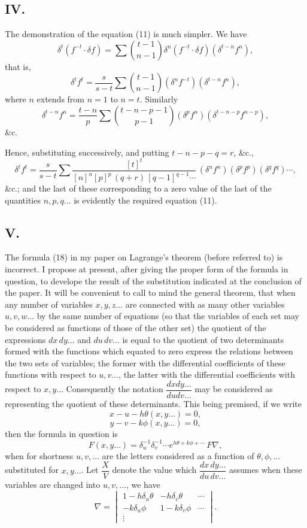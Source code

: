 \documentclass[11pt]{article}
\begin{document}
\subsection*{IV.}

The demonstration of the equation (11) is much simpler. We have
\[ \delta^t(f^{-t}\!\cdot\!\delta f) = \sum\binom{t-1}{n-1}\delta^n(f^{-t}\!\cdot\!\delta f)(\delta^{t-n}f^n), \]
that is,
\[ \delta^t f^t = \frac{s}{s-t}\sum\binom{t-1}{n-1}(\delta^n f^{-t})(\delta^{t-n}f^n), \]
where $n$ extends from $n=1$ to $n=t$. Similarly
\[ \delta^{t-n}f^n = \frac{t-n}{p}\sum\binom{t-n-p-1}{p-1}(\delta^p f^n)(\delta^{t-n-p}f^{n-p}), \]
\&c.

Hence, substituting successively, and putting $t-n-p-q = r$, \&c.,
\[ \delta^t f^t = \frac{s}{s-t}\sum\frac{[t]^t}{[n]^n[p]^p\,(q+r)\,[q-1]^{q-1}\cdots}\,(\delta^n f^n)(\delta^p f^p)(\delta^q f^q)\cdots, \]
\&c.; and the last of these corresponding to a zero value of the last of the quantities $n,p,q\ldots$ is evidently the required equation (11).

\subsection*{V.}

The formula (18) in my paper on Lagrange's theorem (before referred to) is incorrect. I propose at present, after giving the proper form of the formula in question, to develope the result of the substitution indicated at the conclusion of the paper. It will be convenient to call to mind the general theorem, that when any number of variables $x,y,z\ldots$ are connected with as many other variables $u,v,w\ldots$ by the same number of equations (so that the variables of each set may be considered as functions of those of the other set) the quotient of the expressions $dx\,dy\ldots$ and $du\,dv\ldots$ is equal to the quotient of two determinants formed with the functions which equated to zero express the relations between the two sets of variables; the former with the differential coefficients of these functions with respect to $u,v\ldots$, the latter with the differential coefficients with respect to $x,y\ldots$ Consequently the notation $\dfrac{dxdy\ldots}{dudv\ldots}$ may be considered as representing the quotient of these determinants. This being premised, if we write
\[ x - u - h\theta(x,y\ldots) = 0, \]
\[ y - v - k\phi(x,y\ldots) = 0, \]
then the formula in question is
\[ F(x,y\ldots) = \delta_u^{-1}\delta_v^{-1}\cdots e^{h\theta + k\phi + \cdots}\, F\nabla, \]
when for shortness $u,v,\ldots$ are the letters considered as a function of $\theta,\phi,\ldots$ substituted for $x,y\ldots$. Let $\dfrac{X}{V}$ denote the value which $\dfrac{dx\,dy\ldots}{du\,dv\ldots}$ assumes when these variables are changed into $u,v,\ldots$, we have
\[ \nabla = \begin{vmatrix} 1 - h\delta_u\theta & -h\delta_v\theta & \cdots \\ -k\delta_u\phi & 1 - k\delta_v\phi & \cdots \\ \vdots & & \end{vmatrix}. \]
\end{document}
